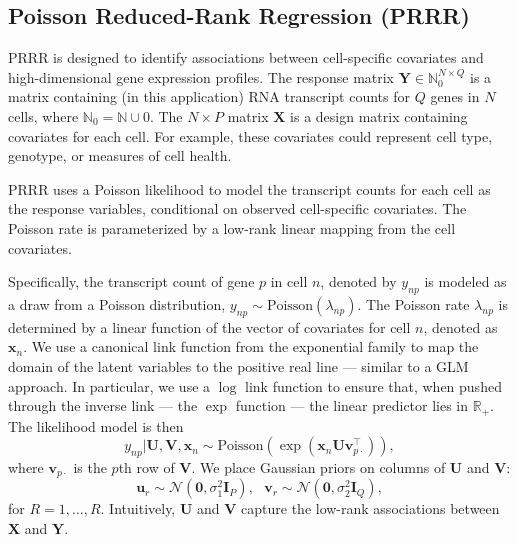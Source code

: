 \documentclass{bmcart}
\begin{document}
\subsection*{Poisson Reduced-Rank Regression (PRRR)}
PRRR is designed to identify associations between cell-specific covariates and high-dimensional gene expression profiles. The response matrix $\mathbf{Y} \in \mathbb{N}_0^{N \times Q}$ is a matrix containing (in this application) RNA transcript counts for $Q$ genes in $N$ cells, where $\mathbb{N}_0 = \mathbb{N}\cup 0$. The $N \times P$ matrix $\mathbf{X}$ is a design matrix containing covariates for each cell. For example, these covariates could represent cell type, genotype, or measures of cell health.

PRRR uses a Poisson likelihood to model the transcript counts for each cell as the response variables, conditional on observed cell-specific covariates. The Poisson rate is parameterized by a low-rank linear mapping from the cell covariates. 

Specifically, the transcript count of gene $p$ in cell $n$, denoted by $y_{np}$ is modeled as a draw from a Poisson distribution, $y_{np} \sim \text{Poisson}(\lambda_{np})$. The Poisson rate $\lambda_{np}$ is determined by a linear function of the vector of covariates for cell $n$, denoted as $\mathbf{x}_n$. 
We use a canonical link function from the exponential family to map the domain of the latent variables to the positive real line --- similar to a GLM approach. In particular, we use a $\log$ link function to ensure that, when pushed through the inverse link --- the $\exp$ function --- the linear predictor lies in $\mathbb{R}_+$. The likelihood model is then
\begin{equation}
    y_{np} | \mathbf{U}, \mathbf{V}, \mathbf{x}_n \sim \text{Poisson} (\exp(\mathbf{x}_n \mathbf{U}\mathbf{v}_{p\cdot}^\top)), \label{eq:gprrr1}
\end{equation}
where $\mathbf{v}_{p\cdot}$ is the $p$th row of $\mathbf{V}$. We place Gaussian priors on columns of $\mathbf{U}$ and $\mathbf{V}$:
\begin{equation}
\mathbf{u}_{r} \sim \mathcal{N}(\mathbf{0}, \sigma^2_1 \mathbf{I}_P),~~~\mathbf{v}_{r} \sim \mathcal{N}(\mathbf{0}, \sigma^2_2 \mathbf{I}_Q),
\end{equation}
for $R = 1, \dots, R$. Intuitively, $\mathbf{U}$ and $\mathbf{V}$ capture the low-rank associations between $\mathbf{X}$ and $\mathbf{Y}$.
\end{document}
